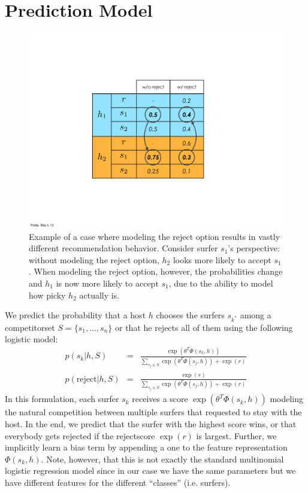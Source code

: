 \section{Prediction Model}
\label{sec:model}

\begin{figure}[ht]
\centering
\includegraphics[width=0.6\linewidth]{figures/reject_vs_no_reject.pdf}
\caption{
Example of a case where modeling the reject option results in vastly different recommendation behavior.
Consider surfer $s_1$'s perspective: without modeling the reject option, $h_2$ looks more likely to accept $s_1$.
When modeling the reject option, however, the probabilities change and $h_1$ is now more likely to accept $s_1$, due to the ability to model how picky $h_2$ actually is.}
\label{fig:reject_vs_no_reject}
\end{figure}

We predict the probability that a host $h$ chooses the surfers $s_{k^*}$ among a competitorset $S=\{ s_1, \dots, s_n\}$ or that he rejects all of them using the following logistic model:
\begin{eqnarray}
p(s_k | h, S) &=& \frac{\exp(\theta^T \Phi(s_k,h))}{\sum_{s_j \in S} \exp(\theta^T \Phi(s_j,h)) + \exp(r)} \\
p(\text{reject} | h, S) &=& \frac{\exp(r)}{\sum_{s_j \in S} \exp(\theta^T \Phi(s_j,h)) + \exp(r)}
\end{eqnarray}
In this formulation, each surfer $s_k$ receives a score $\exp(\theta^T \Phi(s_k,h))$ modeling the natural competition between multiple surfers that requested to stay with the host. In the end, we predict that the surfer with the highest score wins, or that everybody gets rejected if the rejectscore $\exp{(r)}$ is largest. 
Further, we implicitly learn a bias term by appending a one to the feature representation $\Phi(s_k,h)$.
Note, however, that this is not exactly the standard multinomial logistic regression model since in our case we have the same parameters but we have different features for the different ``classes'' (i.e. surfers).

